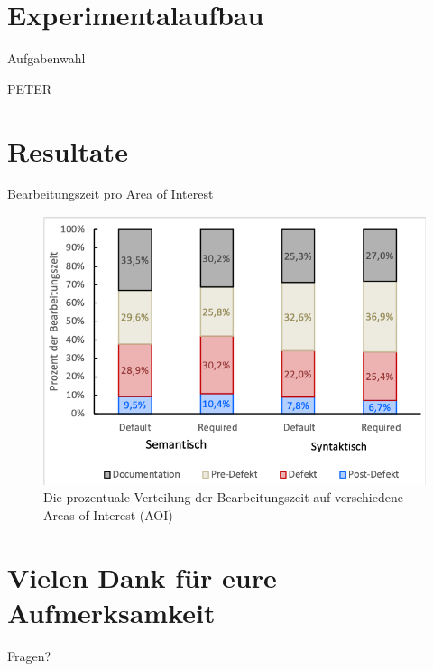 \documentclass[10pt]{beamer}
\begin{document}
\section{Experimentalaufbau}

	\begin{frame}{Aufgabenwahl}

	\end{frame}

	\begin{frame}{PETER}

	\end{frame}

\section{Resultate}

	\begin{frame}{Bearbeitungszeit pro Area of Interest}
		\begin{figure}
			\includegraphics[scale=0.8]{graphics/section_percent.png}
			\caption{\label{fig:section_percent} Die prozentuale Verteilung der Bearbeitungszeit auf verschiedene Areas of Interest (AOI)}
		\end{figure}
	\end{frame}

\section{Vielen Dank für eure Aufmerksamkeit}

\appendix

	\begin{frame}[standout]
		Fragen?
	\end{frame}
\end{document}
